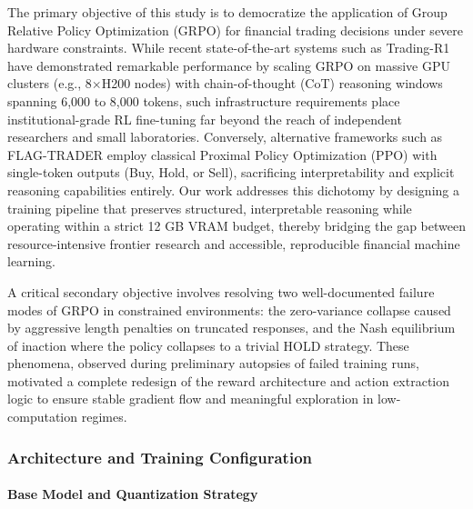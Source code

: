     The primary objective of this study is to democratize the application of Group Relative Policy Optimization (GRPO) \cite{shao2024deepseekmath,deepseek2025deepseekr1} for financial trading decisions under severe hardware constraints. While recent state-of-the-art systems such as Trading-R1 \cite{xiao2025tradingr1} have demonstrated remarkable performance by scaling GRPO on massive GPU clusters (e.g., 8$\times$H200 nodes) with chain-of-thought (CoT) reasoning windows spanning 6,000 to 8,000 tokens, such infrastructure requirements place institutional-grade RL fine-tuning far beyond the reach of independent researchers and small laboratories. Conversely, alternative frameworks such as FLAG-TRADER \cite{xiong2025flagtrader} employ classical Proximal Policy Optimization (PPO) \cite{schulman2017ppo} with single-token outputs (Buy, Hold, or Sell), sacrificing interpretability and explicit reasoning capabilities entirely. Our work addresses this dichotomy by designing a training pipeline that preserves structured, interpretable reasoning while operating within a strict 12 GB VRAM budget, thereby bridging the gap between resource-intensive frontier research and accessible, reproducible financial machine learning.

    A critical secondary objective involves resolving two well-documented failure modes of GRPO in constrained environments: the zero-variance collapse caused by aggressive length penalties on truncated responses, and the Nash equilibrium of inaction where the policy collapses to a trivial HOLD strategy. These phenomena, observed during preliminary autopsies of failed training runs, motivated a complete redesign of the reward architecture and action extraction logic to ensure stable gradient flow and meaningful exploration in low-computation regimes.

    \subsubsection{Architecture and Training Configuration}

    \paragraph{Base Model and Quantization Strategy}

